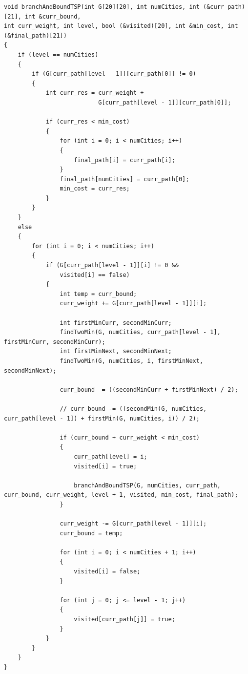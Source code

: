 \documentclass[a4paper]{article}
\begin{document}
\begin{verbatim}
void branchAndBoundTSP(int G[20][20], int numCities, int (&curr_path)[21], int &curr_bound, 
int curr_weight, int level, bool (&visited)[20], int &min_cost, int (&final_path)[21])
{
    if (level == numCities)
    {
        if (G[curr_path[level - 1]][curr_path[0]] != 0)
        {
            int curr_res = curr_weight +
                           G[curr_path[level - 1]][curr_path[0]];

            if (curr_res < min_cost)
            {
                for (int i = 0; i < numCities; i++)
                {
                    final_path[i] = curr_path[i];
                }
                final_path[numCities] = curr_path[0];
                min_cost = curr_res;
            }
        }
    }
    else
    {
        for (int i = 0; i < numCities; i++)
        {
            if (G[curr_path[level - 1]][i] != 0 &&
                visited[i] == false)
            {
                int temp = curr_bound;
                curr_weight += G[curr_path[level - 1]][i];

                int firstMinCurr, secondMinCurr;
                findTwoMin(G, numCities, curr_path[level - 1], firstMinCurr, secondMinCurr);
                int firstMinNext, secondMinNext;
                findTwoMin(G, numCities, i, firstMinNext, secondMinNext);

                curr_bound -= ((secondMinCurr + firstMinNext) / 2);

                // curr_bound -= ((secondMin(G, numCities, curr_path[level - 1]) + firstMin(G, numCities, i)) / 2);

                if (curr_bound + curr_weight < min_cost)
                {
                    curr_path[level] = i;
                    visited[i] = true;

                    branchAndBoundTSP(G, numCities, curr_path, curr_bound, curr_weight, level + 1, visited, min_cost, final_path);
                }

                curr_weight -= G[curr_path[level - 1]][i];
                curr_bound = temp;

                for (int i = 0; i < numCities + 1; i++)
                {
                    visited[i] = false;
                }

                for (int j = 0; j <= level - 1; j++)
                {
                    visited[curr_path[j]] = true;
                }
            }
        }
    }
}
\end{verbatim}
\end{document}
